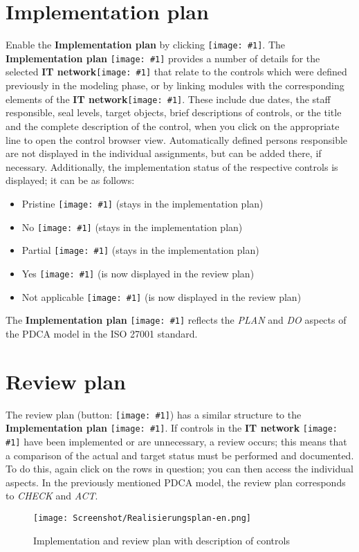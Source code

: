 \documentclass[a4paper,10pt]{book}
\newcommand{\icon}[1]{\texttt{[image: \#1]}}
\begin{document}
\section{Implementation plan}
Enable the \textbf{Implementation plan} by clicking \icon{Icon/Okay.png}.
The \textbf{Implementation plan} \icon{Icon/Okay.png}
provides a number of details for the selected \textbf{IT network}\icon{Icon/GS_Modell.png}
that relate to the controls which were defined previously in the modeling phase, or by linking modules with
the corresponding elements of the \textbf{IT network}\icon{Icon/GS_Modell.png}.
These include due dates, the staff responsible, seal levels, target objects, brief descriptions of
controls, or the title and the complete description of the control, when you click on the appropriate
line to open the control browser view. Automatically defined persons responsible are not displayed
in the individual assignments, but can be added there, if necessary. Additionally, the implementation
status of the respective controls is displayed; it can be as follows:
\begin{itemize}
 \item Pristine \icon{Icon/Unbearbeitet.png} (stays in the implementation plan)
 \item No \icon{Icon/Nein.png} (stays in the implementation plan)
 \item Partial \icon{Icon/Teilweise.png} (stays in the implementation plan)
 \item Yes \icon{Icon/Okay.png} (is now displayed in the review plan)
 \item Not applicable \icon{Icon/Entbehrlich.png} (is now displayed in the review plan)
\end{itemize}
The \textbf{Implementation plan} \icon{Icon/Okay.png} reflects the {\em PLAN} and
{\em DO} aspects of the PDCA model in the ISO 27001 standard.

\section{Review plan}
 The review plan (button: \icon{Icon/Pruefplan.png}) has a similar structure to the
 \textbf{Implementation plan} \icon{Icon/Okay.png}. If controls in the
 \textbf{IT network} \icon{Icon/GS_Modell.png}
 have been implemented or are unnecessary, a review occurs; this means that a comparison of the
 actual and target status must be performed and documented. To do this, again click on the rows
 in question; you can then access the individual aspects. In the previously mentioned PDCA model,
 the review plan corresponds to {\em CHECK} and {\em ACT}.
 \begin{figure}[htb!]
  \centering
  \texttt{[image: Screenshot/Realisierungsplan-en.png]}
  \caption{\label{Implementation and review plan with description of controls} Implementation and review plan with description of controls}
\end{figure}
\end{document}
